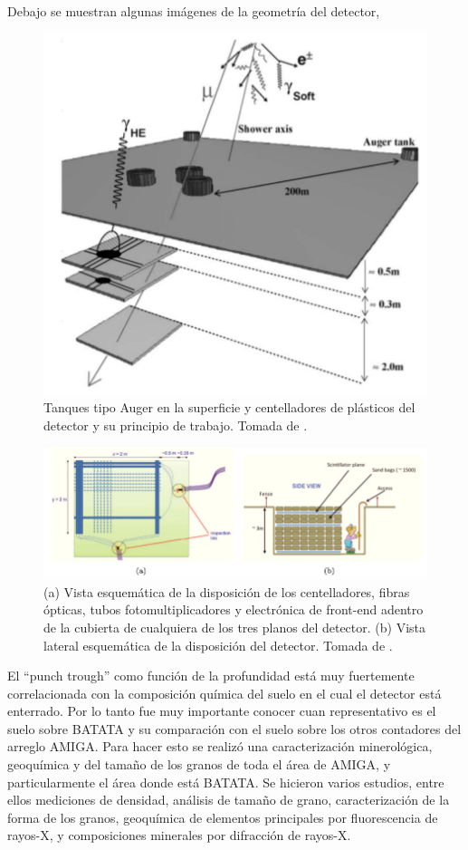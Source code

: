 \documentclass[a4paper,10pt]{article}
\numberwithin{equation}{section}
\begin{document}
Debajo se muestran algunas imágenes de la geometría del detector,

\begin{figure}[H]
 \center 
 \includegraphics[scale=0.5]{fig1}
 \caption{Tanques tipo Auger en la superficie y centelladores de plásticos del 
 detector y su principio de trabajo. Tomada de \cite{alfaro}.}
\end{figure}

\begin{figure}[H]
 \center 
 \includegraphics[scale=0.46]{fig2}
 \caption{(a) Vista esquemática de la disposición de los centelladores, 
 fibras ópticas, tubos fotomultiplicadores y electrónica de front-end adentro 
 de la cubierta de cualquiera de los tres planos del detector. (b) Vista lateral 
 esquemática de la disposición del detector. Tomada de \cite{trovato}.}
\end{figure}

El ``punch trough'' como función de la profundidad está muy fuertemente correlacionada 
con la composición química del suelo en el cual el detector está enterrado. Por lo 
tanto fue muy importante conocer cuan representativo es el suelo sobre BATATA y 
su comparación con el suelo sobre los otros contadores del arreglo AMIGA. Para hacer 
esto se realizó una caracterización minerológica, geoquímica y del tamaño de los 
granos de toda el área de AMIGA, y particularmente el área donde está BATATA. Se 
hicieron varios estudios, entre ellos mediciones de densidad, análisis de tamaño 
de grano, caracterización de la forma de los granos, geoquímica de elementos 
principales por fluorescencia de rayos-X, y composiciones minerales por difracción 
de rayos-X. 
\end{document}
